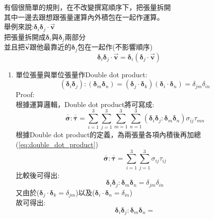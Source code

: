 \documentclass[../main.tex]{subfiles}
\begin{document}
\begin{itemize}
\begin{itemize}
      有個很簡單的規則，在不改變撰寫順序下，把張量拆開\\
      其中一邊去跟想跟張量運算內外積包在一起作運算。\\
      舉例來說:$\bm\delta_i\bm\delta_j \cdot \vec {\bm v}$\\
      把張量拆開成$\bm\delta_i$與$\bm\delta_j$兩部分\\
      並且把$\vec {\bm v}$跟他最靠近的$\bm\delta_j$包在一起作(不影響順序)
      \begin{equation}
        \bm\delta_i\bm\delta_j \cdot \vec {\bm v} = \bm\delta_i (\bm\delta_j \cdot \vec {\bm v})
      \end{equation}
      \begin{enumerate}
        \item 單位張量與單位張量作Double dot product:
          \begin{equation}
            \boxed{
              \left(\bm\delta_i\bm\delta_j\right):\left(\bm\delta_m\bm\delta_n\right) =
              \left(\bm\delta_j \cdot \bm\delta_k\right) \left(
                \bm\delta_i \cdot \bm\delta_n
              \right) = \delta_{jm}\delta_{in}
            }
          \end{equation}
          Proof:\\
          根據運算邏輯，Double dot product將可寫成:
          \begin{equation}
            \overline{\overline{\bm \sigma}} : \overline{\overline{\bm \tau}} = 
            \sum_{i=1}^3\sum_{j=1}^3 \sum_{m=1}^3 \sum_{n=1}^3
            \left(\bm \delta_i \bm \delta_j : \bm \delta_m \bm \delta_n\right)\sigma_{ij} \tau_{mn}
          \end{equation}
          根據Double dot product的定義，為兩張量各項內積後再加總(\ref{eq:double_dot_product})
          \begin{equation}
            \overline{\overline{\bm \sigma}} : \overline{\overline{\bm \tau}} =
            \sum_{i=1}^3\sum_{j=1}^3 \sigma_{ij} \tau_{ij}
          \end{equation}
          比較後可得出:
          \begin{equation}
            \bm \delta_i \bm \delta_j : \bm \delta_m \bm \delta_n = \delta_{jm}\delta_{in}
          \end{equation}
          又由於($\bm \delta_j \cdot \bm \delta_k = \delta_{jm}$)以及($\bm \delta_i \cdot \bm \delta_n = \delta_{in}$)\\
          故可得出:
          \begin{equation}
            \bm \delta_i \bm \delta_j : \bm \delta_m \bm \delta_n = 

\end{equation}
\end{enumerate}
\end{itemize}
\end{itemize}
\end{document}
